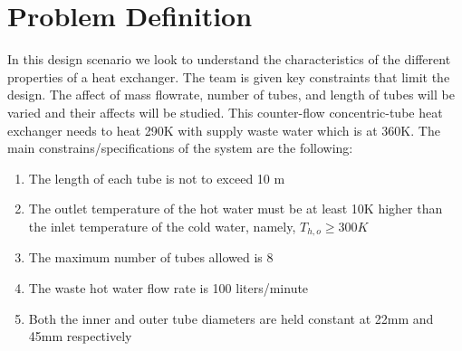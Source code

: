 \section{Problem Definition}
In this design scenario we look to understand the characteristics of the different properties of a heat exchanger. The team is given key constraints that limit the design. The affect of mass flowrate, number of tubes, and length of tubes will be varied and their affects will be studied. This counter-flow concentric-tube heat exchanger needs to heat 290K with supply waste water which is at 360K. The main constrains/specifications of the system are the following:
%
\begin{enumerate}
    \itemsep 0em 
    \item The length of each tube is not to exceed 10 m
    \item The outlet temperature of the hot water must be at least 10K higher than the inlet temperature of the cold water, namely, $T_{h,o} \geq 300K$
    \item The maximum number of tubes allowed is 8
    \item The waste hot water flow rate is 100 liters/minute
    \item Both the inner and outer tube diameters are held constant at 22mm and 45mm respectively
\end{enumerate}
%
%
